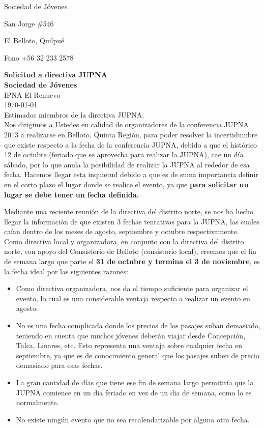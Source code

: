 \documentclass[12pt,letterpaper]{article}
\begin{document}
\hfill Sociedad de Jóvenes

\hfill San Jorge \#546

\hfill El Belloto, Quilpué

\hfill Fono +56 32 233 2578

\hfill \textbf{Solicitud a directiva JUPNA}
\\
\textbf{Sociedad de Jóvenes} \\ IPNA El Renuevo \\  \today \\

Estimados miembros de la directiva JUPNA:\\

Nos dirigimos a Ustedes en calidad de organizadores de la conferencia JUPNA 2013 a realizarse en Belloto, Quinta Región, para poder resolver la incertidumbre que existe respecto a la fecha de la conferencia JUPNA, debido a que el histórico 12 de octubre (feriado que se aprovecha para realizar la JUPNA), cae un día sábado, por lo que anula la posibilidad de realizar la JUPNA al rededor de esa fecha. Hacemos llegar esta inquietud debido a que es de suma importancia definir en el corto plazo el lugar donde se realice el evento, ya que \textbf{para solicitar un lugar se debe tener un fecha definida.}

Mediante una reciente reunión de la directiva del distrito norte, se nos ha hecho llegar la información de que existen 3 fechas tentativas para la JUPNA, las cuales caían dentro de los meses de agosto, septiembre y octubre respectivamente.\\


Como directiva local y organizadora, en conjunto con la directiva del distrito norte, con apoyo del Consistorio de Belloto (consistorio local), creemos que el fin de semana largo que parte el \textbf{31 de octubre y termina el 3 de noviembre}, es la fecha ideal por las siguientes razones:

\begin{itemize}
\item Como directiva organizadora, nos da el tiempo suficiente para organizar el evento, lo cual es una considerable ventaja respecto a realizar un evento en agosto.
\item No es una fecha complicada donde los precios de los pasajes suban demasiado, teniendo en cuenta que muchos jóvenes deberán viajar desde Concepción, Talca, Linares, etc. Esto representa una ventaja sobre cualquier fecha en septiembre, ya que es de conocimiento general que los pasajes suben de precio demasiado para esas fechas.
\item La gran cantidad de días que tiene ese fin de semana largo permitiría que la JUPNA comience en un dia feriado en vez de un dia de semana, como lo es normalmente.
\item No existe ningún evento que no sea recalendarizable por alguna otra fecha.
\end{itemize}
\end{document}
